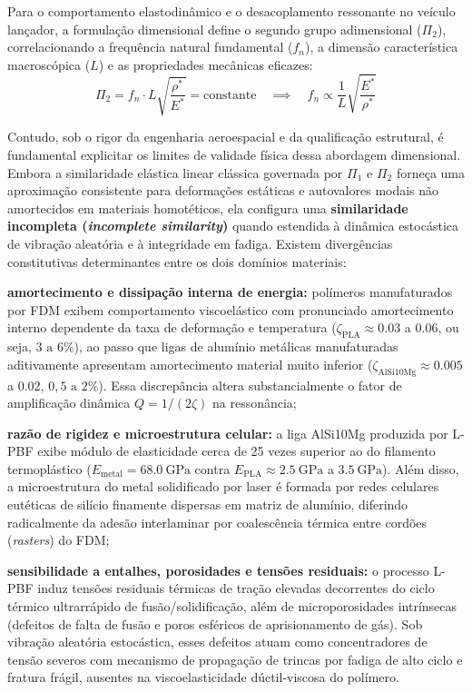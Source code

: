 Para o comportamento elastodinâmico e o desacoplamento ressonante no veículo lançador, a formulação dimensional define o segundo grupo adimensional ($\Pi_2$), correlacionando a frequência natural fundamental ($f_n$), a dimensão característica macroscópica ($L$) e as propriedades mecânicas eficazes:
\begin{equation}
  \Pi_2 = f_n \cdot L \sqrt{\frac{\rho^{*}}{E^{*}}} = \text{constante} \quad \implies \quad f_n \propto \frac{1}{L} \sqrt{\frac{E^{*}}{\rho^{*}}}
  \label{eq:fn}
\end{equation}

Contudo, sob o rigor da engenharia aeroespacial e da qualificação estrutural, é fundamental explicitar os limites de validade física dessa abordagem dimensional. Embora a similaridade elástica linear clássica governada por $\Pi_1$ e $\Pi_2$ forneça uma aproximação consistente para deformações estáticas e autovalores modais não amortecidos em materiais homotéticos, ela configura uma \textbf{similaridade incompleta (\textit{incomplete similarity})} quando estendida à dinâmica estocástica de vibração aleatória e à integridade em fadiga. Existem divergências constitutivas determinantes entre os dois domínios materiais:
\begin{alineas}
  \item \textbf{amortecimento e dissipação interna de energia:} polímeros manufaturados por FDM exibem comportamento viscoelástico com pronunciado amortecimento interno dependente da taxa de deformação e temperatura ($\zeta_{\text{PLA}} \approx \num{0.03}$ a $\num{0.06}$, ou seja, $3\text{ a }6\%$), ao passo que ligas de alumínio metálicas manufaturadas aditivamente apresentam amortecimento material muito inferior ($\zeta_{\text{AlSi10Mg}} \approx \num{0.005}$ a $\num{0.02}$, $0{,}5\text{ a }2\%$). Essa discrepância altera substancialmente o fator de amplificação dinâmica $Q = 1 / (2\zeta)$ na ressonância;
  \item \textbf{razão de rigidez e microestrutura celular:} a liga AlSi10Mg produzida por L-PBF exibe módulo de elasticidade cerca de 25 vezes superior ao do filamento termoplástico ($E_{\text{metal}} = \SI{68.0}{\giga\pascal}$ contra $E_{\text{PLA}} \approx \SI{2.5}{\giga\pascal}$ a $\SI{3.5}{\giga\pascal}$). Além disso, a microestrutura do metal solidificado por laser é formada por redes celulares eutéticas de silício finamente dispersas em matriz de alumínio, diferindo radicalmente da adesão interlaminar por coalescência térmica entre cordões (\textit{rasters}) do FDM;
  \item \textbf{sensibilidade a entalhes, porosidades e tensões residuais:} o processo L-PBF induz tensões residuais térmicas de tração elevadas decorrentes do ciclo térmico ultrarrápido de fusão/solidificação, além de microporosidades intrínsecas (defeitos de falta de fusão e poros esféricos de aprisionamento de gás). Sob vibração aleatória estocástica, esses defeitos atuam como concentradores de tensão severos com mecanismo de propagação de trincas por fadiga de alto ciclo e fratura frágil, ausentes na viscoelasticidade dúctil-viscosa do polímero.
\end{alineas}


